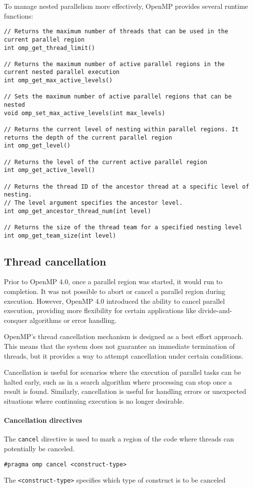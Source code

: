To manage nested parallelism more effectively, OpenMP provides several runtime functions:
\begin{lstlisting}[style=C]
// Returns the maximum number of threads that can be used in the current parallel region
int omp_get_thread_limit()

// Returns the maximum number of active parallel regions in the current nested parallel execution
int omp_get_max_active_levels()

// Sets the maximum number of active parallel regions that can be nested
void omp_set_max_active_levels(int max_levels)

// Returns the current level of nesting within parallel regions. It returns the depth of the current parallel region
int omp_get_level()

// Returns the level of the current active parallel region
int omp_get_active_level()

// Returns the thread ID of the ancestor thread at a specific level of nesting. 
// The level argument specifies the ancestor level.
int omp_get_ancestor_thread_num(int level)

// Returns the size of the thread team for a specified nesting level
int omp_get_team_size(int level)
\end{lstlisting}

\subsection{Thread cancellation}
Prior to OpenMP 4.0, once a parallel region was started, it would run to completion. 
It was not possible to abort or cancel a parallel region during execution. 
However, OpenMP 4.0 introduced the ability to cancel parallel execution, providing more flexibility for certain applications like divide-and-conquer algorithms or error handling.

OpenMP's thread cancellation mechanism is designed as a best effort approach. 
This means that the system does not guarantee an immediate termination of threads, but it provides a way to attempt cancellation under certain conditions.

Cancellation is useful for scenarios where the execution of parallel tasks can be halted early, such as in a search algorithm where processing can stop once a result is found. 
Similarly, cancellation is useful for handling errors or unexpected situations where continuing execution is no longer desirable.

\paragraph*{Cancellation directives}
The \texttt{cancel} directive is used to mark a region of the code where threads can potentially be canceled.
\begin{lstlisting}[style=C]
#pragma omp cancel <construct-type>
\end{lstlisting}
The \texttt{<construct-type>} specifies which type of construct is to be canceled

